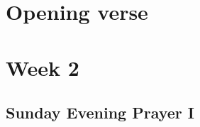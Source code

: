 


\chapter{Opening verse}

{%
\parindent 0pt
\noindent
\ifx\preLilyPondExample \undefined
\else
  \expandafter\preLilyPondExample
\fi
\def\lilypondbook{}%

\ifx\postLilyPondExample \undefined
\else
  \expandafter\postLilyPondExample
\fi
}

\chapter{Week 2}

\section{Sunday Evening Prayer I}

{%
\parindent 0pt
\noindent
\ifx\preLilyPondExample \undefined
\else
  \expandafter\preLilyPondExample
\fi
\def\lilypondbook{}%

\ifx\postLilyPondExample \undefined
\else
  \expandafter\postLilyPondExample
\fi
}



\null\medskip{%
\parindent 0pt
\noindent
\ifx\preLilyPondExample \undefined
\else
  \expandafter\preLilyPondExample
\fi
\def\lilypondbook{}%

\ifx\postLilyPondExample \undefined
\else
  \expandafter\postLilyPondExample
\fi
}

\newpage

{%
\parindent 0pt
\noindent
\ifx\preLilyPondExample \undefined
\else
  \expandafter\preLilyPondExample
\fi
\def\lilypondbook{}%

\ifx\postLilyPondExample \undefined
\else
  \expandafter\postLilyPondExample
\fi
}


\null\medskip{%
\parindent 0pt
\noindent
\ifx\preLilyPondExample \undefined
\else
  \expandafter\preLilyPondExample
\fi
\def\lilypondbook{}%

\ifx\postLilyPondExample \undefined
\else
  \expandafter\postLilyPondExample
\fi
}

